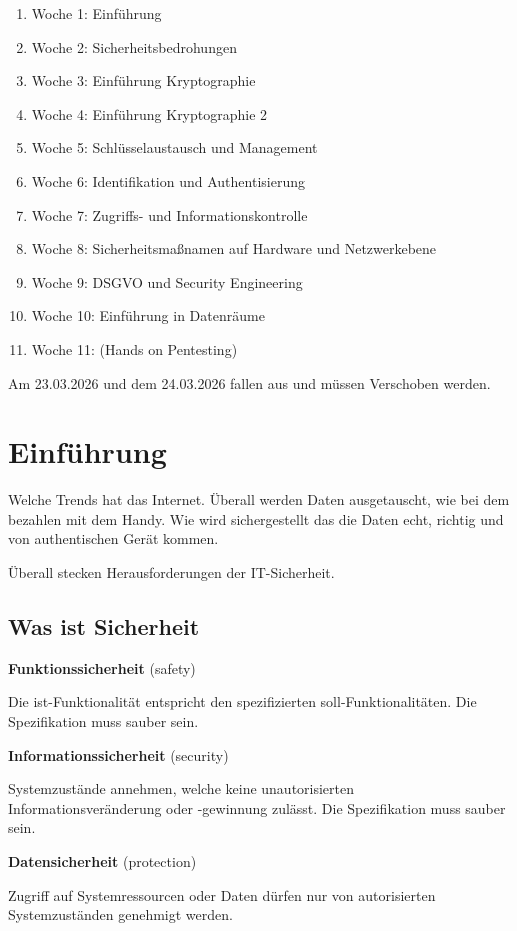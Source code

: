 \documentclass[a4paper]{article}
\begin{document}
\begin{enumerate}
    \item Woche 1: Einführung
    \item Woche 2: Sicherheitsbedrohungen
    \item Woche 3: Einführung Kryptographie
    \item Woche 4: Einführung Kryptographie 2
    \item Woche 5: Schlüsselaustausch und Management
    \item Woche 6: Identifikation und Authentisierung
    \item Woche 7: Zugriffs- und Informationskontrolle
    \item Woche 8: Sicherheitsmaßnamen auf Hardware und Netzwerkebene
    \item Woche 9: DSGVO und Security Engineering
    \item Woche 10: Einführung in Datenräume
    \item Woche 11: (Hands on Pentesting)
\end{enumerate}

Am 23.03.2026 und dem 24.03.2026 fallen aus und müssen Verschoben werden.

\section{Einführung}

Welche Trends hat das Internet. Überall werden Daten ausgetauscht, wie bei dem bezahlen mit dem Handy. Wie wird sichergestellt das die Daten echt, richtig und von authentischen Gerät kommen.

Überall stecken Herausforderungen der IT-Sicherheit.

\subsection{Was ist Sicherheit}

\textbf{Funktionssicherheit} (safety)

Die ist-Funktionalität entspricht den spezifizierten soll-Funktionalitäten.
Die Spezifikation muss sauber sein.

\textbf{Informationssicherheit} (security)

Systemzustände annehmen, welche keine unautorisierten Informationsveränderung oder -gewinnung zulässt.
Die Spezifikation muss sauber sein.

\textbf{Datensicherheit} (protection)

Zugriff auf Systemressourcen oder Daten dürfen nur von autorisierten Systemzuständen genehmigt werden.
\end{document}
